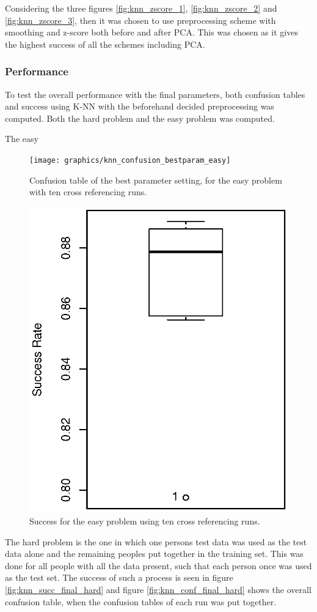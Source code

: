 Considering the three figures \ref{fig:knn_zscore_1}, \ref{fig:knn_zscore_2} and \ref{fig:knn_zscore_3}, then it was chosen to use preprocessing scheme with smoothing and z-score both before and after PCA.
This was chosen as it gives the highest success of all the schemes including PCA.

\subsubsection{Performance}

To test the overall performance with the final parameters, both confusion tables and success using K-NN with the beforehand decided preprocessing was computed.
Both the hard problem and the easy problem was computed.

The easy 


\begin{figure}[H]
\centering
\texttt{[image: graphics/knn\_confusion\_bestparam\_easy]}
\caption{Confusion table of the best parameter setting, for the easy problem with ten cross referencing runs.}
\label{fig:knn_conf_final_easy}
\end{figure}


\begin{figure}[H]
\centering
\includegraphics[width = 0.7 \textwidth]{graphics/knn_final_full_easy}
\caption{Success for the easy problem using ten cross referencing runs.}
\label{fig:knn_succ_final_easy}
\end{figure}


The hard problem is the one in which one persons test data was used as the test data alone and the remaining peoples put together in the training set.
This was done for all people with all the data present, such that each person once was used as the test set.
The success of such a process is seen in figure \ref{fig:knn_succ_final_hard} and figure \ref{fig:knn_conf_final_hard} shows the overall confusion table, when the confusion tables of each run was put together.


